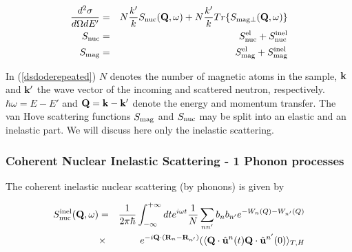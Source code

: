 
\begin{eqnarray}\label{dsdoderepeated}
\frac{d^2\sigma}{d\Omega dE'}&=&
N\frac{k'}{k}S_{\rm nuc}(\mathbf Q,\omega) +
N\frac{k'}{k} 
Tr\{S_{\rm mag\perp}(\mathbf Q,\omega)\} \nonumber \\
S_{\rm nuc}&=&S_{\rm nuc}^{\rm el}+S_{\rm nuc}^{\rm inel} \label{snuc} \\ 
S_{\rm mag}&=&S_{\rm mag}^{\rm el}+S_{\rm mag}^{\rm inel} \label{smag} 
\end{eqnarray}


In (\ref{dsdoderepeated}) $N$ denotes the number of magnetic atoms in the sample, $\mathbf k$ and $\mathbf k'$ the wave vector %
of the incoming and scattered neutron, respectively.
$\hbar \omega=E-E'$  and
$\mathbf Q =\mathbf k-\mathbf k'$  denote the energy and momentum transfer.
The van Hove scattering functions $S_{\rm mag}$ and $S_{\rm nuc}$ may be split into an elastic and an inelastic part. We %
will discuss here only the inelastic scattering. 

\subsubsection{Coherent Nuclear Inelastic Scattering - 1 Phonon processes}

The coherent inelastic nuclear scattering (by phonons) is given by

\begin{eqnarray}\label{Snucinel}
S_{\rm nuc}^{\rm inel}(\mathbf Q,\omega)&=&
\frac{1}{2\pi\hbar}\int_{-\infty}^{+\infty}dt e^{i\omega t}
\frac{1}{N}\sum_{nn'} b_n b_{n'} e^{-W_n(Q)- W_{n'}(Q)}\\
&\times&  e^{-i\mathbf Q \cdot (\mathbf R_n-\mathbf R_{n'})}  
 (\langle  \mathbf Q \cdot \hat {\mathbf u}^{n}(t)  {\mathbf Q} \cdot \hat{\mathbf u}^{n'}(0) \rangle_{T,H}
\nonumber
\end{eqnarray}

